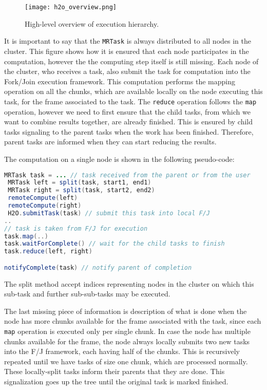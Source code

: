 \begin{figure}
	\centering
	\texttt{[image: h2o\_overview.png]}
	\caption{High-level overview of execution hierarchy.}
	\label{fig:h2o_overview}
\end{figure}

It is important to say that the \texttt{MRTask} is always distributed to all nodes in the cluster. This figure shows how it is ensured that each node participates in the computation, however the the computing step itself is still missing. Each node of the cluster, who receives a task, also submit the task for computation into the Fork/Join execution framework. This computation performs the mapping operation on all the chunks, which are available locally on the node executing this task, for the frame associated to the task. The \texttt{reduce} operation follows the \texttt{map} operation, however we need to first ensure that the child tasks, from which we want to combine results together, are already finished. This is ensured by child tasks signaling to the parent tasks when the work has been finished. Therefore, parent tasks are informed when they can start reducing the results. 

The computation on a single node is shown in the following pseudo-code:
\begin{lstlisting}[language=Java]
 MRTask task = ... // task received from the parent or from the user
 MRTask left = split(task, start1, end1)
 MRTask right = split(task, start2, end2)
 remoteCompute(left)
 remoteCompute(right)
 H2O.submitTask(task) // submit this task into local F/J
..
// task is taken from F/J for execution
task.map(..)
task.waitForComplete() // wait for the child tasks to finish
task.reduce(left, right)

notifyComplete(task) // notify parent of completion
\end{lstlisting}
The split method accept indices representing nodes in the cluster on which this sub-task and further sub-sub-tasks may be executed.

The last missing piece of information is description of what is done when the node has more chunks available for the frame associated with the task, since each \texttt{map} operation is executed only per single chunk. In case the node has multiple chunks available for the frame, the node always locally submits two new tasks into the F/J framework, each having half of the chunks. This is recursively repeated until we have tasks of size one chunk, which are processed normally. These locally-split tasks inform their parents that they are done. This signalization goes up the tree until the original task is marked finished.

